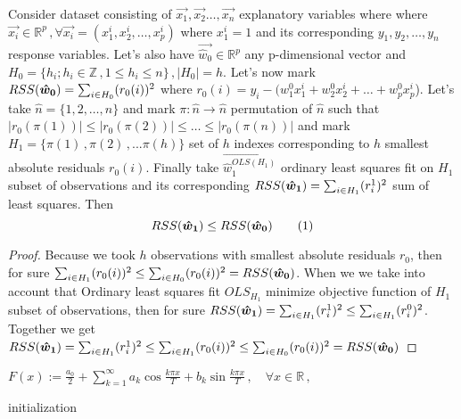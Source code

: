 \begin{veta}
Consider dataset consisting of
$\vec{x_1}, \vec{x_2} \ldots,\vec{x_n}$ explanatory variables where where 
$\vec{x_i}\in\mathbb{R}^p\,, \forall \vec{x_i} = (x^i_1, x^i_2,\ldots,x^i_p)$ where $x^i_1 = 1$
and its corresponding $y_1, y_2,\ldots,y_n$ response variables. 
Let's also have $\vec{\hat{w}_0}\in\mathbb{R}^p$ any p-dimensional vector and 
$H_0 = \{{h_i ; h_i \in\mathbb{Z}\,, 1 \leq h_i \leq n\}}\,, |H_0| = h$. 
Let's now mark $RSS(\boldsymbol{\hat{w}_0}) = \sum_{i\in H_0} (r_0(i))^2$ where 
$r_0(i) = y_i - (w_1^0x^i_1 + w_2^0x^i_2 +\ldots+ w_p^0x^i_p$).
Let's take $\hat{n} = \{{1,2,\ldots,n\}}$ and mark
$\pi: \hat{n} \rightarrow \hat{n}$ permutation of $\hat{n}$ such that $|r_0({\pi(1)})| \leq |r_0({\pi(2)})| \leq \ldots \leq |r_0({\pi(n)})|$
and mark $H_1 = \{{\pi(1)\,, \pi(2)\,,... \pi(h)\}}$ set of $h$ indexes corresponding to $h$ smallest absolute residuals $r_0(i)$.
Finally take $\vec{\hat{w}^{OLS(H_1)}_1 }$ ordinary least squares fit on $H_1$ subset of observations
and its corresponding $RSS(\boldsymbol{\hat{w}_1}) = \sum_{i\in H_1} (r_i^1)^2$ sum of least squares. Then
\[ 
	RSS(\what{1}) \leq RSS(\what{0}) \numberthis
\]
\end{veta}

\begin{proof}
	Because we took $h$ observations with smallest absolute residuals $r_0$, then for sure $\sum_{i\in H_1} (r_0(i))^2 \leq \sum_{i\in H_0} (r_0(i))^2 =  RSS(\boldsymbol{\hat{w}_0})$.
	When we we take into account that Ordinary least squares fit $OLS_{H_1}$ minimize objective function of 
	$H_1$ subset of observations, then for sure  $RSS(\boldsymbol{\hat{w}_1}) =  \sum_{i\in H_1} (r_i^1)^2 \leq \sum_{i\in H_1} (r_i^0)^2$.
	Together we get $RSS(\boldsymbol{\hat{w}_1}) =  \sum_{i\in H_1} (r_i^1)^2 \leq  \sum_{i\in H_1} (r_0(i))^2 \leq \sum_{i\in H_0} (r_0(i))^2 =  RSS(\boldsymbol{\hat{w}_0})$
\end{proof}

$   F(x):=\frac{a_0}{2} + \sum_{k=1}^\infty a_k \cos\frac{k\pi x}{T} + b_k \sin\frac{k\pi x}{T}\,, \quad \forall x\in\mathbb{R}\,,
$





\begin{algorithm}[H]
	initialization\;
\end{algorithm}


